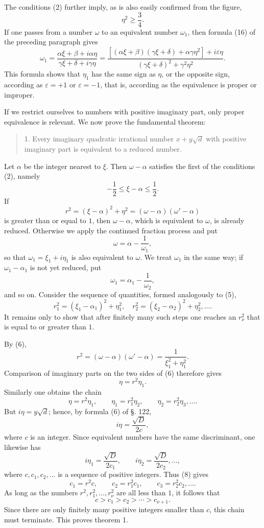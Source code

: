 \documentclass[11pt]{article}
\begin{document}
The conditions (2) further imply, as is also easily confirmed from the figure,
\[
\tag{3}        \eta^2\ge\frac34.
\]
If one passes from a number $\omega$ to an equivalent number $\omega_1$, then formula (16) of the preceding paragraph gives
\[
\tag{4}
\omega_1=\frac{\alpha\xi+\beta+i\alpha\eta}{\gamma\xi+\delta+i\gamma\eta}
=\frac{[(\alpha\xi+\beta)(\gamma\xi+\delta)+\alpha\gamma\eta^2]+i\varepsilon\eta}
       {(\gamma\xi+\delta)^2+\gamma^2\eta^2}.
\]
This formula shows that $\eta_1$ has the same sign as $\eta$, or the opposite sign, according as $\varepsilon=+1$ or $\varepsilon=-1$, that is, according as the equivalence is proper or improper.

If we restrict ourselves to numbers with positive imaginary part, only proper equivalence is relevant. We now prove the fundamental theorem:
\begin{quote}
1. Every imaginary quadratic irrational number $x+y\sqrt d$ with positive imaginary part is equivalent to a reduced number.
\end{quote}

Let $\alpha$ be the integer nearest to $\xi$. Then $\omega-\alpha$ satisfies the first of the conditions (2), namely
\[
        -\frac12\le \xi-\alpha\le\frac12.
\]
If
\[
\tag{5}        r^2=(\xi-\alpha)^2+\eta^2=(\omega-\alpha)(\omega'-\alpha)
\]
is greater than or equal to $1$, then $\omega-\alpha$, which is equivalent to $\omega$, is already reduced. Otherwise we apply the continued fraction process and put
\[
\tag{6}        \omega=\alpha-\frac1{\omega_1},
\]
so that $\omega_1=\xi_1+i\eta_1$ is also equivalent to $\omega$. We treat $\omega_1$ in the same way; if $\omega_1-\alpha_1$ is not yet reduced, put
\[
\tag{7}        \omega_1=\alpha_1-\frac1{\omega_2},
\]
and so on. Consider the sequence of quantities, formed analogously to (5),
\[
        r_1^2=(\xi_1-\alpha_1)^2+\eta_1^2,
        \quad
        r_2^2=(\xi_2-\alpha_2)^2+\eta_2^2,
        \ldots.
\]
It remains only to show that after finitely many such steps one reaches an $r_\nu^2$ that is equal to or greater than $1$.

By (6),
\[
        r^2=(\omega-\alpha)(\omega'-\alpha)=\frac1{\xi_1^2+\eta_1^2}.
\]
Comparison of imaginary parts on the two sides of (6) therefore gives
\[
        \eta=r^2\eta_1.
\]
Similarly one obtains the chain
\[
\tag{8}        \eta=r^2\eta_1,
        \qquad
        \eta_1=r_1^2\eta_2,
        \qquad
        \eta_2=r_2^2\eta_3,\ldots.
\]
But $i\eta=y\sqrt d$; hence, by formula (6) of §. 122,
\[
        i\eta=\frac{\sqrt D}{2c},
\]
where $c$ is an integer. Since equivalent numbers have the same discriminant, one likewise has
\[
        i\eta_1=\frac{\sqrt D}{2c_1},
        \qquad
        i\eta_2=\frac{\sqrt D}{2c_2},\ldots,
\]
where $c,c_1,c_2,\ldots$ is a sequence of positive integers. Thus (8) gives
\[
\tag{9}        c_1=r^2c,
        \qquad
        c_2=r_1^2c_1,
        \qquad
        c_3=r_2^2c_2,
        \ldots.
\]
As long as the numbers $r^2,r_1^2,\ldots,r_\nu^2$ are all less than $1$, it follows that
\[
\tag{10}       c>c_1>c_2>\cdots>c_{\nu+1}.
\]
Since there are only finitely many positive integers smaller than $c$, this chain must terminate. This proves theorem 1.
\end{document}
